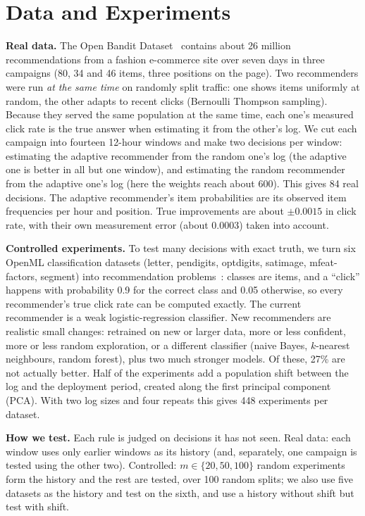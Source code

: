 \documentclass[conference]{IEEEtran}
\begin{document}
\section{Data and Experiments}
\textbf{Real data.} The Open Bandit Dataset~\cite{saito2021obd} contains about 26 million recommendations from a fashion e-commerce site over seven days in three campaigns (80, 34 and 46 items, three positions on the page). Two recommenders were run \emph{at the same time} on randomly split traffic: one shows items uniformly at random, the other adapts to recent clicks (Bernoulli Thompson sampling). Because they served the same population at the same time, each one's measured click rate is the true answer when estimating it from the other's log. We cut each campaign into fourteen 12-hour windows and make two decisions per window: estimating the adaptive recommender from the random one's log (the adaptive one is better in all but one window), and estimating the random recommender from the adaptive one's log (here the weights reach about 600). This gives 84 real decisions. The adaptive recommender's item probabilities are its observed item frequencies per hour and position. True improvements are about $\pm0.0015$ in click rate, with their own measurement error (about 0.0003) taken into account.

\textbf{Controlled experiments.} To test many decisions with exact truth, we turn six OpenML classification datasets (letter, pendigits, optdigits, satimage, mfeat-factors, segment) into recommendation problems~\cite{dudik2011dr}: classes are items, and a ``click'' happens with probability 0.9 for the correct class and 0.05 otherwise, so every recommender's true click rate can be computed exactly. The current recommender is a weak logistic-regression classifier. New recommenders are realistic small changes: retrained on new or larger data, more or less confident, more or less random exploration, or a different classifier (naive Bayes, $k$-nearest neighbours, random forest), plus two much stronger models. Of these, 27\% are not actually better. Half of the experiments add a population shift between the log and the deployment period, created along the first principal component (PCA). With two log sizes and four repeats this gives 448 experiments per dataset.

\textbf{How we test.} Each rule is judged on decisions it has not seen. Real data: each window uses only earlier windows as its history (and, separately, one campaign is tested using the other two). Controlled: $m\in\{20,50,100\}$ random experiments form the history and the rest are tested, over 100 random splits; we also use five datasets as the history and test on the sixth, and use a history without shift but test with shift.
\end{document}
